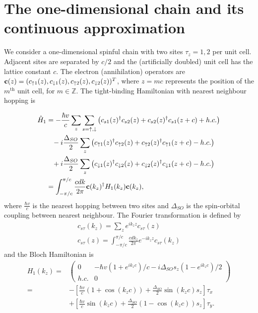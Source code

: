\section{The one-dimensional chain and its continuous approximation}

We consider a one-dimensional spinful chain with two sites $\tau_z=1,2$ per unit cell. Adjacent sites are separated by $c/2$ and the (artificially doubled) unit cell has the lattice constant $c$. 
The electron (annihilation) operators are ${\bf c}(z)=(c_{\uparrow1}(z),c_{\downarrow1}(z),c_{\uparrow2}(z),c_{\downarrow2}(z))^T$, where $z=mc$ represents the position of the $m^{\mathrm{th}}$ unit cell, for $m\in\mathbb{Z}$. The tight-binding Hamiltonian with nearest neighbour hopping is

\begin{align}
    \hat{H}_1&=-\frac{\hbar v}{c}\sum_z\sum_{s=\uparrow,\downarrow}\left(c_{s1}(z)^\dagger c_{s2}(z)+c_{s2}(z)^\dagger c_{s1}(z+c)+h.c.\right)\nonumber\\
    &\;\;\;-i\frac{\Delta_{SO}}{2}\sum_z\left(c_{\uparrow1}(z)^\dagger c_{\uparrow2}(z)+c_{\uparrow2}(z)^\dagger c_{\uparrow1}(z+c)-h.c.\right)\nonumber\\
    &\;\;\;+i\frac{\Delta_{SO}}{2}\sum_z\left(c_{\downarrow1}(z)^\dagger c_{\downarrow2}(z)+c_{\downarrow2}(z)^\dagger c_{\downarrow1}(z+c)-h.c.\right)\nonumber\\
    &=\int_{-\pi/c}^{\pi/c}\frac{cdk}{2\pi}{\bf c}(k_z)^\dagger H_1(k_z){\bf c}(k_z),\label{H1}
\end{align}
where $\frac{\hbar v}{c}$ is the nearest hopping between two sites and $\Delta_{SO}$ is the spin-orbital coupling between nearest neighbour. The Fourier transformation is defined by 
\begin{equation}
\begin{aligned}
     c_{s\tau}(k_z)=\sum_ze^{ik_zz}c_{s\tau}(z)\\ c_{s\tau}(z)=\int_{-\pi/c}^{\pi/c}\frac{cdk_z}{2\pi}e^{-ik_zz}c_{s\tau}(k_z)
\end{aligned}
\end{equation}
and the Bloch Hamiltonian is 
\begin{align}
H_1(k_z)=&\begin{pmatrix}
0&-\hbar v(1+e^{ik_zc})/c-i\Delta_{SO}s_z(1-e^{ik_zc})/2\\
h.c.&0\end{pmatrix}\nonumber\\
=&-\left[\frac{\hbar v}{c}\left(1+\cos(k_zc)\right)+\frac{\Delta_{SO}}{2}\sin(k_zc)s_z\right]\tau_x\\&+\left[\frac{\hbar v}{c}\sin(k_zc)+\frac{\Delta_{SO}}{2}\left(1-\cos(k_zc)\right)s_z\right]\tau_y.
\label{BlochH1}
\end{align}

